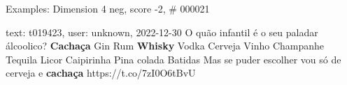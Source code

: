 \begin{frame}{Examples: Dimension 4 neg, score -2, \# 000021}
\footnotesize
\begin{alertblock}{text: t019423, user: unknown, 2022-12-30}
O quão infantil é o seu paladar álcoolico? \textbf{Cachaça}  
Gin  Rum  \textbf{Whisky} 
 Vodka  Cerveja  Vinho 
 Champanhe  Tequila  
Licor  Caipirinha  Pina colada 
 Batidas  Mas se puder escolher vou só de 
cerveja e \textbf{cachaça} https://t.co/7zI0O6tBvU 
\end{alertblock}
\end{frame}
